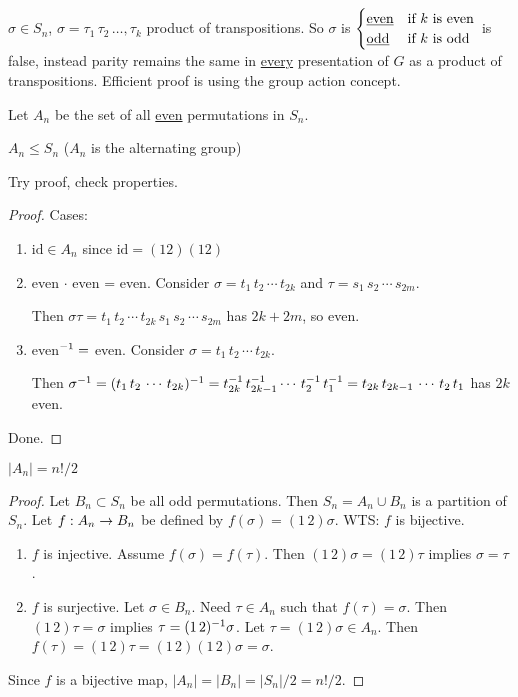 \documentclass[]{article}
\begin{document}
$\sigma\in S_n$, $\sigma = \tau_1\,\tau_2\,\dots,\tau_k$ product of transpositions.
So $\sigma$ is $\begin{cases} \text{\underline{even}} & \text{if $k$ is even} \\ \text{\underline{odd}} & \text{if $k$ is odd} \end{cases}$ is false, instead parity remains the same in \ul{every} presentation of $G$ as a product of transpositions. Efficient proof is using the group action concept.

Let $A_n$ be the set of all \ul{even} permutations in $S_n$.
\begin{proposition}
	$A_n\leq S_n$ ($A_n$ is the alternating group)
\end{proposition}
Try proof, check properties.

\begin{proof}
	Cases:
	\begin{enumerate}
		\item $\text{id}\in A_n$ since $\text{id} = (12)(12)$
		\item even $\cdot$ even = even. Consider $\sigma = t_1\,t_2\,\cdots\,t_{2k}$ and $\tau = s_1\,s_2\,\cdots\,s_{2m}$.
			
			Then $\sigma\tau = t_1\,t_2\,\cdots\,t_{2k}\,s_1\,s_2\,\cdots\,s_{2m}$ has $2k+2m$, so even.
		\item even$^{-1} =$ even. Consider $\sigma = t_1\,t_2\,\cdots\,t_{2k}$.
			
			Then $\sigma^{-1} = (t_1\,t_2\,\cdots\,t_{2k})^{-1} = t_{2k}^{-1}\,t_{2k-1}^{-1}\cdots\, t_2^{-1}\,t_1^{-1} = t_{2k}\,t_{2k-1}\,\cdots\,t_2\,t_1$ has $2k$ even.
	\end{enumerate}
	Done.
\end{proof}

\begin{proposition}
	$|A_n| = n!/2$
\end{proposition}
\begin{proof}
	Let $B_n\subset S_n$ be all odd permutations. Then $S_n = A_n\cup B_n$ is a partition of $S_n$. Let $f: A_n\rightarrow B_n$ be defined by $f(\sigma) = (1\,2)\sigma$.
	WTS: $f$ is bijective.
	\begin{enumerate}
		\item $f$ is injective. Assume $f(\sigma) = f(\tau)$. Then $(1\,2)\sigma = (1\,2)\tau$ implies $\sigma = \tau$.
		\item $f$ is surjective. Let $\sigma\in B_n$. Need $\tau\in A_n$ such that $f(\tau) = \sigma$. Then $(1\,2)\tau = \sigma$ implies $\tau = (1\,2)^{-1}\sigma$. Let $\tau = (1\,2)\sigma\in A_n$. Then $f(\tau) = (1\,2)\tau = (1\,2)(1\,2)\sigma = \sigma$.
	\end{enumerate}
	Since $f$ is a bijective map, $|A_n| = |B_n| = |S_n|/2 = n!/2$.
\end{proof}
\end{document}
